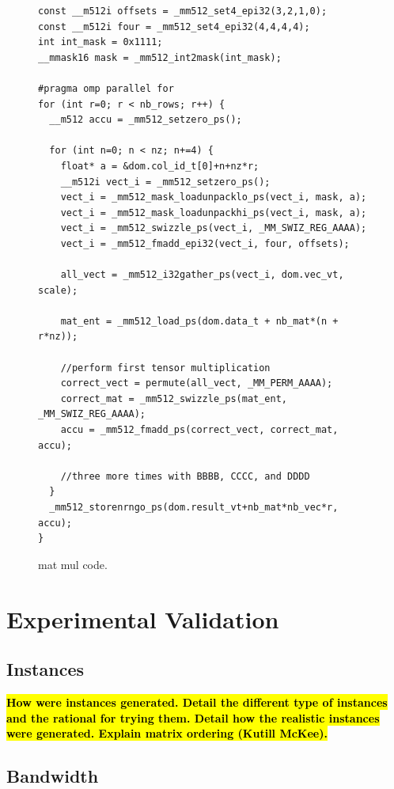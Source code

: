 \documentclass[10pt,conference,compsocconf]{IEEEtran}
\newcommand{\todo}[1]{{\color{red}\textbf{\hl{#1}}\xspace}}
\begin{document}
\begin{figure}
\begin{verbatim}
const __m512i offsets = _mm512_set4_epi32(3,2,1,0);
const __m512i four = _mm512_set4_epi32(4,4,4,4); 
int int_mask = 0x1111;
__mmask16 mask = _mm512_int2mask(int_mask);

#pragma omp parallel for
for (int r=0; r < nb_rows; r++) {
  __m512 accu = _mm512_setzero_ps();

  for (int n=0; n < nz; n+=4) {
    float* a = &dom.col_id_t[0]+n+nz*r;
    __m512i vect_i = _mm512_setzero_ps();
    vect_i = _mm512_mask_loadunpacklo_ps(vect_i, mask, a);
    vect_i = _mm512_mask_loadunpackhi_ps(vect_i, mask, a);
    vect_i = _mm512_swizzle_ps(vect_i, _MM_SWIZ_REG_AAAA);
    vect_i = _mm512_fmadd_epi32(vect_i, four, offsets);

    all_vect = _mm512_i32gather_ps(vect_i, dom.vec_vt, scale);

    mat_ent = _mm512_load_ps(dom.data_t + nb_mat*(n + r*nz));

    //perform first tensor multiplication
    correct_vect = permute(all_vect, _MM_PERM_AAAA);
    correct_mat = _mm512_swizzle_ps(mat_ent, _MM_SWIZ_REG_AAAA);
    accu = _mm512_fmadd_ps(correct_vect, correct_mat, accu);

    //three more times with BBBB, CCCC, and DDDD
  }
  _mm512_storenrngo_ps(dom.result_vt+nb_mat*nb_vec*r, accu);  
} 
\end{verbatim}
\caption{mat mul code.}
\label{code:mat_mul}
\end{figure}





\section{Experimental Validation}
\label{sec:expe}

\subsection{Instances}

\todo{How were instances generated. Detail the different type of
  instances and the rational for trying them. Detail how the realistic
  instances were generated. Explain matrix ordering (Kutill McKee).}

\subsection{Bandwidth}
\end{document}
